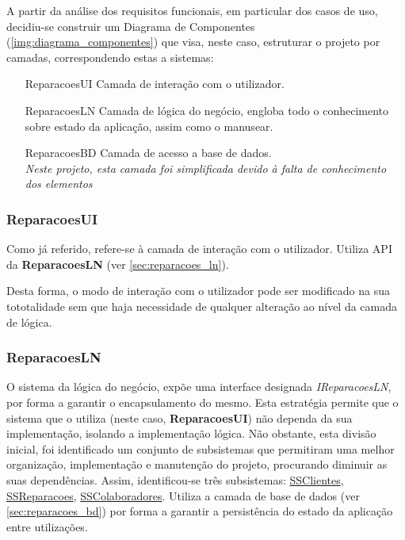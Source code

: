 \documentclass[../relatorio.tex]{subfiles}
\begin{document}
A partir da análise dos requisitos funcionais, em particular dos casos de uso,
decidiu-se construir um Diagrama de Componentes (\ref{img:diagrama_componentes}) que visa, neste caso,
estruturar o projeto por camadas, correspondendo estas a sistemas:
\begin{itemize}
    \item[ReparacoesUI]{
          Camada de interação com o utilizador.
          }
    \item[ReparacoesLN]{
          Camada de lógica do negócio, engloba todo o conhecimento sobre estado
          da aplicação, assim como o manusear.
          }
    \item[ReparacoesBD] {
          Camada de acesso a base de dados. \\
          \textit{Neste projeto, esta camada foi simplificada devido
              à falta de conhecimento dos elementos}
          }
\end{itemize}

\subsubsection*{ReparacoesUI} \label{sec:reparacoes_ui}
Como já referido, refere-se à camada de interação com o utilizador.
Utiliza API da \textbf{ReparacoesLN} (ver \ref{sec:reparacoes_ln}).

Desta forma, o modo de interação com o utilizador pode ser modificado na sua tototalidade
sem que haja necessidade de qualquer alteração ao nível da camada de lógica.

\subsubsection*{ReparacoesLN} \label{sec:reparacoes_ln}
O sistema da lógica do negócio, expõe uma interface designada \textit{IReparacoesLN}, por forma a garantir o encapsulamento do mesmo.
Esta estratégia permite que o sistema que o utiliza (neste caso, \textbf{ReparacoesUI})
não dependa da sua implementação, isolando a implementação lógica.
Não obstante, esta divisão inicial, foi identificado um conjunto de subsistemas que permitiram
uma melhor organização, implementação e manutenção do projeto, procurando diminuir as suas dependências.
Assim, identificou-se três subsistemas: \underline{SSClientes}, \underline{SSReparacoes}, \underline{SSColaboradores}.
Utiliza a camada de base de dados (ver \ref{sec:reparacoes_bd}) por forma a garantir a persistência do estado da
aplicação entre utilizações.
\end{document}
